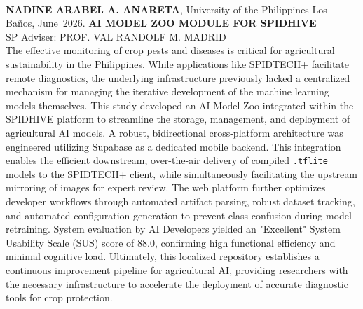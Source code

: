 \documentclass{icsthesis}
\renewcommand{\TITLE}{AI MODEL ZOO MODULE FOR SPIDHIVE}
\renewcommand{\AUTHOR}{NADINE ARABEL A. ANARETA}
\renewcommand{\MONTH}{June}
\renewcommand{\YEAR}{2026}
\begin{document}
\begin{frontmatter}
		\maketableofcontents
		
		\makelistoftables

		\makelistoffigures
	
		
		\begin{abstractwithpageno}	
		\\
		\textbf{\AUTHOR}, University of the Philippines Los Ba\~{n}os, \MONTH\ \YEAR. \textbf{\TITLE}
		\\SP Adviser: PROF. VAL RANDOLF M. MADRID\\
			
		The effective monitoring of crop pests and diseases is critical for agricultural sustainability in the Philippines. While applications like SPIDTECH+ facilitate remote diagnostics, the underlying infrastructure previously lacked a centralized mechanism for managing the iterative development of the machine learning models themselves. This study developed an AI Model Zoo integrated within the SPIDHIVE platform to streamline the storage, management, and deployment of agricultural AI models. A robust, bidirectional cross-platform architecture was engineered utilizing Supabase as a dedicated mobile backend. This integration enables the efficient downstream, over-the-air delivery of compiled \texttt{.tflite} models to the SPIDTECH+ client, while simultaneously facilitating the upstream mirroring of images for expert review. The web platform further optimizes developer workflows through automated artifact parsing, robust dataset tracking, and automated configuration generation to prevent class confusion during model retraining. System evaluation by AI Developers yielded an "Excellent" System Usability Scale (SUS) score of 88.0, confirming high functional efficiency and minimal cognitive load. Ultimately, this localized repository establishes a continuous improvement pipeline for agricultural AI, providing researchers with the necessary infrastructure to accelerate the deployment of accurate diagnostic tools for crop protection.
		\end{abstractwithpageno}

	\end{frontmatter}
	
\end{document}
